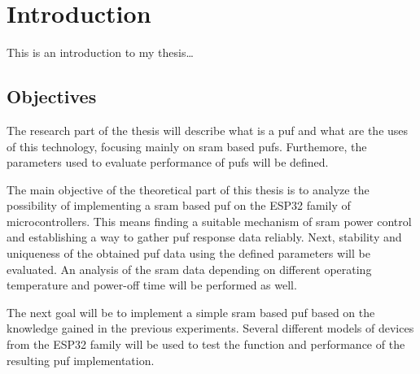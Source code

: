 \chapter{Introduction}

    This is an introduction to my thesis\ldots

\section{Objectives}

The research part of the thesis will describe what is a \gls{puf} and what are the uses of this technology, focusing mainly on \gls{sram} based \glspl{puf}. Furthemore, the parameters used to evaluate performance of \glspl{puf} will be defined.

The main objective of the theoretical part of this thesis is to analyze the possibility of implementing a \gls{sram} based \gls{puf} on the ESP32 family of microcontrollers. This means finding a suitable mechanism of \gls{sram} power control and establishing a way to gather \gls{puf} response data reliably. Next, stability and uniqueness of the obtained \gls{puf} data using the defined parameters will be evaluated. An analysis of the \gls{sram} data depending on different operating temperature and power-off time will be performed as well.

The next goal will be to implement a simple \gls{sram} based \gls{puf} based on the knowledge gained in the previous experiments. Several different models of devices from the ESP32 family will be used to test the function and performance of the resulting \gls{puf} implementation.\cite{Sestakova2018}

